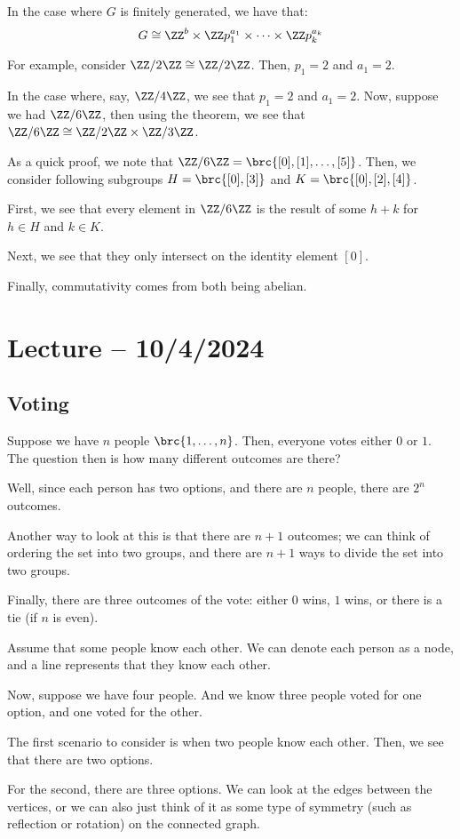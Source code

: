 \documentclass[openany]{book}
\begin{document}
In the case where $G$ is finitely generated, we have that:
\begin{equation*}
	G \cong \ZZ^{b} \times \ZZ p_1^{a_1} \times \cdots \times \ZZ p_k^{a_k}
\end{equation*}

\begin{example}
	For example, consider $\ZZ/2\ZZ \cong \ZZ/2\ZZ$. Then, $p_1 = 2$ and $a_1 = 2$.
	
	In the case where, say, $\ZZ/4\ZZ$, we see that $p_1 = 2$ and $a_1 = 2$. Now, suppose we had $\ZZ/6\ZZ$, then using the theorem, we see that $\ZZ/6\ZZ \cong \ZZ/2\ZZ \times \ZZ/3\ZZ$.
	\begin{innerproof}
		As a quick proof, we note that $\ZZ/6\ZZ = \brc{[0], [1], \ldots, [5]}$. Then, we consider following subgroups $H = \brc{[0], [3]}$ and $K = \brc{[0], [2], [4]}$.
		
		First, we see that every element in $\ZZ/6\ZZ$ is the result of some $h + k$ for $h \in H$ and $k \in K$.
		
		Next, we see that they only intersect on the identity element $[0]$.
		
		Finally, commutativity comes from both being abelian.
	\end{innerproof}
\end{example}

\section{Lecture -- 10/4/2024}
\subsection{Voting}
\begin{example}
	Suppose we have $n$ people $\brc{1, \ldots, n}$. Then, everyone votes either $0$ or $1$. The question then is how many different outcomes are there?
	
	Well, since each person has two options, and there are $n$ people, there are $2^{n}$ outcomes.
	
	Another way to look at this is that there are $n+1$ outcomes; we can think of ordering the set into two groups, and there are $n+1$ ways to divide the set into two groups.
	
	Finally, there are three outcomes of the vote: either $0$ wins, $1$ wins, or there is a tie (if $n$ is even).
\end{example}

\begin{example}
	Assume that some people know each other. We can denote each person as a node, and a line represents that they know each other.
	
	Now, suppose we have four people. And we know three people voted for one option, and one voted for the other.
	
	The first scenario to consider is when two people know each other. Then, we see that there are two options.
	
	For the second, there are three options. We can look at the edges between the vertices, or we can also just think of it as some type of symmetry (such as reflection or rotation) on the connected graph.
\end{example}
\end{document}

